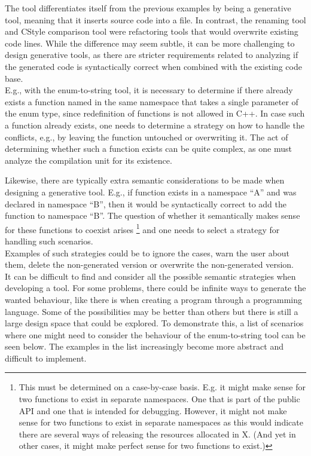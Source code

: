 The tool differentiates itself from the previous examples by being a generative tool, meaning that it inserts source code into a file.
In contrast, the renaming tool and CStyle comparison tool were refactoring tools that would overwrite existing code lines.
While the difference may seem subtle, it can be more challenging to design generative tools, as there are stricter requirements related to analyzing if the generated code is syntactically correct when combined with the existing code base.\\
E.g., with the enum-to-string tool, it is necessary to determine if there already exists a function named  in the same namespace that takes a single parameter of the enum type, since redefinition of functions is not allowed in C++.
In case such a function already exists, one needs to determine a strategy on how to handle the conflicts, e.g., by leaving the function untouched or overwriting it.
The act of determining whether such a function exists can be quite complex, as one must analyze the compilation unit for its existence.

Likewise, there are typically extra semantic considerations to be made when designing a generative tool. E.g., if  function exists in a namespace ``A'' and  was declared in namespace ``B'', then it would be syntactically correct to add the  function to namespace ``B''. The question of whether it semantically makes sense for these functions to coexist arises
\footnote{This must be determined on a case-by-case basis. E.g. it might make sense for two  functions to exist in separate namespaces. One that is part of the public API and one that is intended for debugging. However, it might not make sense for two  functions to exist in separate namespaces as this would indicate there are several ways of releasing the resources allocated in X. (And yet in other cases, it might make perfect sense for two  functions to exist.)}
and one needs to select a strategy for handling such scenarios.\\
Examples of such strategies could be to ignore the cases, warn the user about them, delete the non-generated version or overwrite the non-generated version.\\
It can be difficult to find and consider all the possible semantic strategies when developing a tool. For some problems, there could be infinite ways to generate the wanted behaviour, like there is when creating a program through a programming language. Some of the possibilities may be better than others but there is still a large design space that could be explored.
To demonstrate this, a list of scenarios where one might need to consider the behaviour of the enum-to-string tool can be seen below. The examples in the list increasingly become more abstract and difficult to implement.

